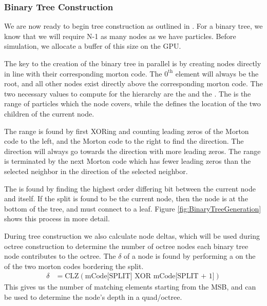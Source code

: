 \documentclass{thesis}
\begin{document}
\subsubsection{Binary Tree Construction}
We are now ready to begin tree construction as outlined in \cite{Karas:2012}. For a binary tree, we know that we will require N-1 as many nodes as we have particles. Before simulation, we allocate a buffer of this size on the GPU.

The key to the creation of the binary tree in parallel is by creating nodes directly in line with their corresponding morton code. The $\text{0}^\text{th}$ element will always be the root, and all other nodes exist directly above the corresponding morton code. The two necessary values to compute for the hierarchy are the  and the . The  is the range of particles which the node covers, while the  defines the location of the two children of the current node. 

The range is found by first XORing and counting leading zeros of the Morton code to the left, and the Morton code to the right to find the direction. The direction will always go towards the direction with more leading zeros. The range is terminated by the next Morton code which has fewer leading zeros than the selected neighbor in the direction of the selected neighbor. 

The  is found by finding the highest order differing bit between the current node and itself. If the split is found to be the current node, then the node is at the bottom of the tree, and must connect to a leaf. Figure \ref{fig:BinaryTreeGeneration} shows this process in more detail.

During tree construction we also calculate node deltas, which will be used during octree construction to determine the number of octree nodes each binary tree node contributes to the octree. The $\delta$ of a node is found by performing a  on the  of the two morton codes bordering the split.
\begin{align}
    \delta &= \text{CLZ}(\text{mCode[SPLIT]} \text{ XOR } \text{mCode[SPLIT + 1]})
\end{align}
This gives us the number of matching elements starting from the MSB, and can be used to determine the node's depth in a quad/octree.

\end{document}

